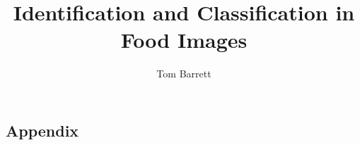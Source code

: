 \documentclass[a4paper,12pt,fleqn]{report}
\newcommand\blankpage{%
        \null
        \thispagestyle{empty}%
        \addtocounter{page}{-1}%
        \newpage}
\begin{document}
\title{Identification and Classification in Food Images}
\author{Tom Barrett}
\maketitle



%
%
\tableofcontents








\printbibliography

\begin{appendices}
\chapter{Appendix}

\end{appendices}
\end{document}
